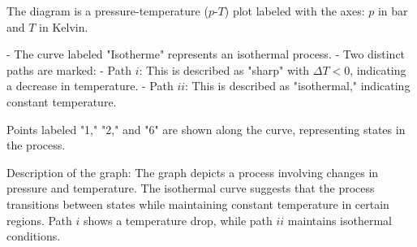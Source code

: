 The diagram is a pressure-temperature (\( p \)-\( T \)) plot labeled with the axes: \( p \) in bar and \( T \) in Kelvin.  

- The curve labeled "Isotherme" represents an isothermal process.  
- Two distinct paths are marked:  
  - Path \( i \): This is described as "sharp" with \( \Delta T < 0 \), indicating a decrease in temperature.  
  - Path \( ii \): This is described as "isothermal," indicating constant temperature.  

Points labeled "1," "2," and "6" are shown along the curve, representing states in the process.  

Description of the graph:  
The graph depicts a process involving changes in pressure and temperature. The isothermal curve suggests that the process transitions between states while maintaining constant temperature in certain regions. Path \( i \) shows a temperature drop, while path \( ii \) maintains isothermal conditions.